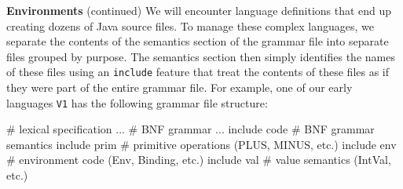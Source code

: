 \begin{minipage}[t]{\sw}
\slidenumber
\LARGE
{\bf Environments} (continued)\exx
We will encounter language definitions
that end up creating dozens of Java source files.
To manage these complex languages,
we separate the contents of the semantics section of the grammar file
into separate files grouped by purpose.
The semantics section then simply identifies the names of these files
using an \verb'include' feature
that treat the contents of these files
as if they were part of the entire grammar file.\exx
For example, one of our early languages \verb'V1'
has the following grammar file structure:
\begin{qv}
# lexical specification
...
%
# BNF grammar
...
%
include code  # BNF grammar semantics
include prim  # primitive operations (PLUS, MINUS, etc.)
include env   # environment code (Env, Binding, etc.)
include val   # value semantics (IntVal, etc.)
\end{qv}
\end{minipage}
